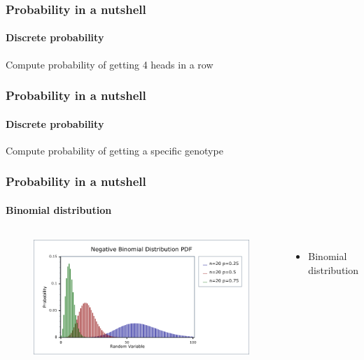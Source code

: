 \documentclass[aspectratio=43]{beamer}
\begin{document}
\begin{frame}

	\frametitle{Probability in a nutshell}
	\framesubtitle{Discrete probability}
	
	\footnotesize
	
	Compute probability of getting 4 heads in a row

\end{frame}

\begin{frame}
	
	\frametitle{Probability in a nutshell}
	\framesubtitle{Discrete probability}
	
	\footnotesize
	
	Compute probability of getting a specific genotype

\end{frame}

\begin{frame}
	
	\frametitle{Probability in a nutshell}
	\framesubtitle{Binomial distribution}
	
	\footnotesize
	
	\begin{columns}	
		
		
		\begin{figure}
			\includegraphics[width = 6 cm]{plots/part1/binomial.png}
		\end{figure}
		
		
		\begin{itemize}
			\item Binomial distribution
		\end{itemize}
		
	\end{columns}

\end{frame}
\end{document}
